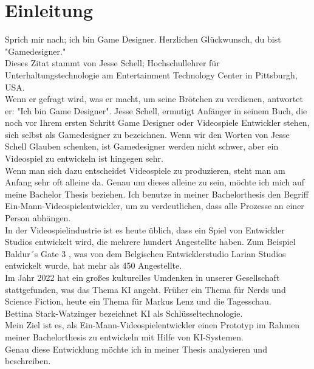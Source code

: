 \documentclass[12pt,a4paper,bibliography=totocnumbered,listof=totocnumbered]{scrartcl}
\begin{document}
\section{Einleitung}
Sprich mir nach; ich bin Game Designer. Herzlichen Glückwunsch, du bist "Gamedesigner."
\\
Dieses Zitat stammt von Jesse Schell; Hochschullehrer für Unterhaltungstechnologie am Entertainment Technology Center in Pittsburgh, USA.
\\
Wenn er gefragt wird, was er macht, um seine Brötchen zu verdienen, antwortet er: "Ich bin Game Designer". Jesse Schell, ermutigt Anfänger in seinem Buch, die noch vor Ihrem ersten Schritt Game Designer oder Videospiele Entwickler stehen, sich selbst als Gamedesigner zu bezeichnen. Wenn wir den Worten von Jesse Schell Glauben schenken, ist Gamedesigner werden nicht schwer, aber ein Videospiel zu entwickeln ist hingegen sehr.
\\
Wenn man sich dazu entscheidet Videospiele zu produzieren, steht man am Anfang sehr oft alleine da. Genau um dieses alleine zu sein, möchte ich mich auf meine Bachelor Thesis beziehen. Ich benutze in meiner Bachelorthesis den Begriff Ein-Mann-Videospielentwickler, um zu verdeutlichen, dass alle Prozesse an einer Person abhängen.
\\
In der Videospielindustrie ist es heute üblich, dass ein Spiel von Entwickler Studios entwickelt wird, die mehrere hundert Angestellte haben. Zum Beispiel Baldur´s Gate 3 , was von dem Belgischen Entwicklerstudio Larian Studios entwickelt wurde, hat mehr als 450 Angestellte.
\\
Im Jahr 2022 hat ein großes kulturelles Umdenken in unserer Gesellschaft stattgefunden, was das Thema KI angeht. Früher ein Thema für Nerds und Science Fiction, heute ein Thema für Markus Lenz und die Tagesschau.
\\
Bettina Stark-Watzinger bezeichnet KI als Schlüsseltechnologie.
\\
Mein Ziel ist es, als Ein-Mann-Videospielentwickler einen Prototyp im Rahmen meiner Bachelorthesis zu entwickeln mit Hilfe von KI-Systemen.
\\
Genau diese Entwicklung möchte ich in meiner Thesis analysieren und beschreiben.
\end{document}
